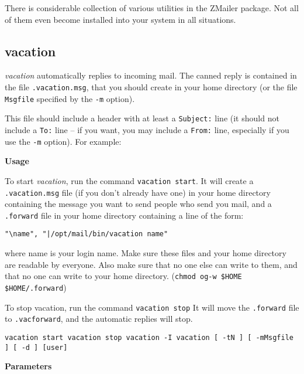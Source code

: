 

There is considerable collection of various utilities in the
ZMailer package. Not all of them even become installed into
your system in all situations.

\subsection{vacation}

{\em vacation\/} automatically replies to incoming mail. The canned 
reply is contained in the file {\tt .vacation.msg}, that you should 
create in your home directory (or the file {\tt Msgfile} specified by 
the {\tt -m} option).

This file should include a header with at least a {\tt Subject:} line 
(it should not include a {\tt To:} line -- if you want, you may include 
a {\tt From:} line, especially if you use the {\tt -m} option). 
For example:

{\bf Usage}

To start {\em vacation\/}, run the command {\tt vacation start}. 
It will create a {\tt .vacation.msg} file (if you don't already 
have one) in your home directory containing the message you want to send 
people who send you mail, and a {\tt .forward} file in your home 
directory containing a line of the form:

\begin{verbatim}
"\name", "|/opt/mail/bin/vacation name"
\end{verbatim}


where name is your login name. Make sure these files and your home 
directory are readable by everyone. Also  make sure  that  no  one  
else  can  write  to  them,  and  that  no  one  can  write  to  your  
home  directory. ({\tt chmod og-w \$HOME \$HOME/.forward})

To stop vacation, run the command {\tt vacation stop} It will move the 
{\tt .forward} file to {\tt .vacforward}, and the automatic 
replies will stop.

{\tt vacation start vacation stop vacation -I vacation [ -tN ] [ -mMsgfile ] [ -d ] [user]}

{\bf Parameters}

